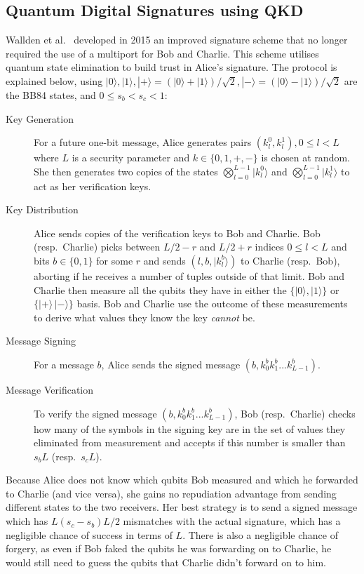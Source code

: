 \documentclass[%
 reprint,
 amsmath,amssymb,
 aps,
 pra,
]{revtex4-1}
\begin{document}
\subsection{Quantum Digital Signatures using QKD}
\label{ssec:qds-using-qkd}

Wallden et al.\ \cite{PhysRevA.91.042304} developed in 2015 an improved signature scheme that no longer required the use of a multiport for Bob and Charlie. This scheme utilises quantum state elimination \cite{PhysRevA.89.022336} to build trust in Alice's signature. The protocol is explained below, using $|0\rangle, |1\rangle, |+\rangle = (|0\rangle + |1\rangle)/\sqrt{2}, |-\rangle = (|0\rangle - |1\rangle)/\sqrt{2}$ are the BB84 \cite{BB84} states, and $0 \leq s_b < s_c < 1$:

\begin{description}
\item[Key Generation]For a future one-bit message, Alice generates pairs $(k^0_l, k^1_l), 0 \leq l < L$ where $L$ is a security parameter and $k \in \{0, 1, +, -\}$ is chosen at random. She then generates two copies of the states $\bigotimes_{l=0}^{L-1}|k^0_l\rangle$ and $\bigotimes_{l=0}^{L-1}|k^1_l\rangle$ to act as her verification keys.
\item[Key Distribution]Alice sends copies of the verification keys to Bob and Charlie. Bob (resp.\ Charlie) picks between $L/2-r$ and $L/2+r$ indices $0 \leq l < L$ and bits $b \in \{0, 1\}$ for some $r$ and sends $(l, b, |k^b_l\rangle)$ to Charlie (resp.\ Bob), aborting if he receives a number of tuples outside of that limit. Bob and Charlie then measure all the qubits they have in either the $\{|0\rangle, |1\rangle\}$ or $\{|+\rangle\, |-\rangle\}$ basis. Bob and Charlie use the outcome of these measurements to derive what values they know the key \textit{cannot} be.
\item[Message Signing]For a message $b$, Alice sends the signed message $(b, k^b_0k^b_1...k^b_{L-1})$.
\item[Message Verification]To verify the signed message $(b, k^b_0k^b_1...k^b_{L-1})$, Bob (resp.\ Charlie) checks how many of the symbols in the signing key are in the set of values they eliminated from measurement and accepts if this number is smaller than $s_bL$ (resp.\ $s_cL$).
\end{description}

Because Alice does not know which qubits Bob measured and which he forwarded to Charlie (and vice versa), she gains no repudiation advantage from sending different states to the two receivers. Her best strategy is to send a signed message which has $L(s_c - s_b)L/2$ mismatches with the actual signature, which has a negligible chance of success in terms of $L$. There is also a negligible chance of forgery, as even if Bob faked the qubits he was forwarding on to Charlie, he would still need to guess the qubits that Charlie didn't forward on to him.
\end{document}
